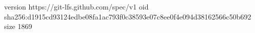 version https://git-lfs.github.com/spec/v1
oid sha256:d1915cd93124edbe08fa1ac793f0c38593e07c8ee0f4e094d38162566c50b692
size 1869

